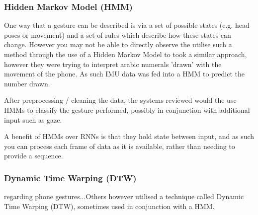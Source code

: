 \subsubsection{Hidden Markov Model (HMM)}\nl
One way that a gesture can be described is via a set of possible states (e.g. head poses or movement) and a set of rules which describe how these states can change.
However you may not be able to directly observe the 
\citeauthor{elmezain2008hidden} utilise such a method through the use of a Hidden Markov Model to \cite{elmezain2008hidden}
\citeauthor{neelasagar2015real} took a similar approach, however they were trying to interpret arabic numerals 'drawn' with the movement of the phone\cite{neelasagar2015real}. As such IMU data was fed into a HMM to predict the number drawn.

After preprocessing / cleaning the data, the systems reviewed would the use HMMs\cite{neelasagar2015real} to classify the gesture performed, possibly in conjunction with additional input such as gaze\cite{kong2021eyemu}.

A benefit of HMMs over RNNs is that they hold state between input, and as such you can process each frame of data as it is available, rather than needing to provide a sequence.

\subsubsection{Dynamic Time Warping (DTW)}
regarding phone gestures...Others however utilised a technique called Dynamic Time Warping (DTW), sometimes used in conjunction with a HMM.
\nl






